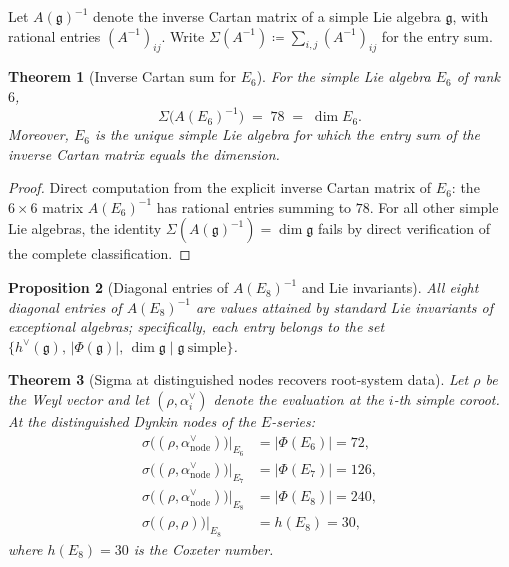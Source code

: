 \documentclass[11pt]{amsart}
\theoremstyle{plain}
\newtheorem{theorem}{Theorem}[section]
\newtheorem{proposition}[theorem]{Proposition}
\theoremstyle{definition}
\theoremstyle{remark}
\renewcommand{\Phi}{\varPhi}
\begin{document}
Let $A(\mathfrak{g})^{-1}$ denote the inverse Cartan matrix of a simple Lie
algebra $\mathfrak{g}$, with rational entries $(A^{-1})_{ij}$.  Write
$\Sigma(A^{-1}) \coloneqq \sum_{i,j}(A^{-1})_{ij}$ for the entry sum.

\begin{theorem}[Inverse Cartan sum for $E_6$]\label{thm:inv-cartan-e6}
For the simple Lie algebra $E_6$ of rank~$6$,
\[
  \Sigma\!\bigl(A(E_6)^{-1}\bigr) \;=\; 78 \;=\; \dim E_6.
\]
Moreover, $E_6$ is the unique simple Lie algebra for which the entry sum of
the inverse Cartan matrix equals the dimension.
\end{theorem}

\begin{proof}
Direct computation from the explicit inverse Cartan matrix of $E_6$:
the $6\times 6$ matrix $A(E_6)^{-1}$ has rational entries summing to $78$.
For all other simple Lie algebras, the identity $\Sigma(A(\mathfrak{g})^{-1})
= \dim\mathfrak{g}$ fails by direct verification of the complete classification.
\end{proof}

\begin{proposition}[Diagonal entries of $A(E_8)^{-1}$ and Lie invariants]%
\label{prop:e8-inv-diag}
All eight diagonal entries of $A(E_8)^{-1}$ are values attained by
standard Lie invariants of exceptional algebras; specifically, each entry
belongs to the set
$\{h^{\vee}(\mathfrak{g}),\,|\Phi(\mathfrak{g})|,\,\dim\mathfrak{g}
  \mid \mathfrak{g}\ \text{simple}\}$.
\end{proposition}

\begin{theorem}[Sigma at distinguished nodes recovers root-system data]%
\label{thm:sigma-rho-nodes}
Let $\rho$ be the Weyl vector and let $(\rho,\alpha_i^{\vee})$ denote the
evaluation at the $i$-th simple coroot.  At the distinguished Dynkin nodes
of the $E$-series:
\begin{align*}
  \sigma\!\bigl((\rho,\alpha^{\vee}_{\mathrm{node}})\bigr)\big|_{E_6}
    &= |\Phi(E_6)| = 72, \\
  \sigma\!\bigl((\rho,\alpha^{\vee}_{\mathrm{node}})\bigr)\big|_{E_7}
    &= |\Phi(E_7)| = 126, \\
  \sigma\!\bigl((\rho,\alpha^{\vee}_{\mathrm{node}})\bigr)\big|_{E_8}
    &= |\Phi(E_8)| = 240, \\
  \sigma\!\bigl((\rho,\rho)\bigr)\big|_{E_8}
    &= h(E_8) = 30,
\end{align*}
where $h(E_8)=30$ is the Coxeter number.
\end{theorem}
\end{document}

